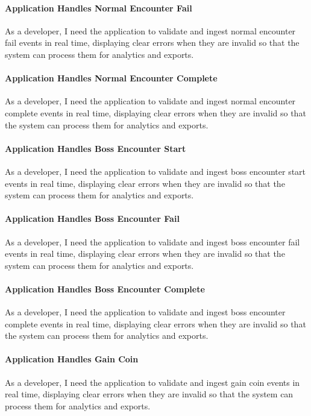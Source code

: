\paragraph{Application Handles Normal Encounter Fail}
As a developer, I need the application to validate and ingest normal encounter fail events in real time, displaying clear errors when they are invalid so that the system can process them for analytics and exports.

\paragraph{Application Handles Normal Encounter Complete}
As a developer, I need the application to validate and ingest normal encounter complete events in real time, displaying clear errors when they are invalid so that the system can process them for analytics and exports.

\paragraph{Application Handles Boss Encounter Start}
As a developer, I need the application to validate and ingest boss encounter start events in real time, displaying clear errors when they are invalid so that the system can process them for analytics and exports.

\paragraph{Application Handles Boss Encounter Fail}
As a developer, I need the application to validate and ingest boss encounter fail events in real time, displaying clear errors when they are invalid so that the system can process them for analytics and exports.

\paragraph{Application Handles Boss Encounter Complete}
As a developer, I need the application to validate and ingest boss encounter complete events in real time, displaying clear errors when they are invalid so that the system can process them for analytics and exports.

\paragraph{Application Handles Gain Coin}
As a developer, I need the application to validate and ingest gain coin events in real time, displaying clear errors when they are invalid so that the system can process them for analytics and exports.

